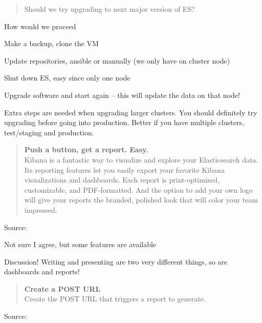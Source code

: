 \documentclass[Screen16to9,17pt]{foils}
\begin{document}



\begin{quote}
Should we try upgrading to next major version of ES?\\
\end{quote}

How would we proceed
\begin{list2}
\item Make a backup, clone the VM
\item Update repositories, ansible or manually (we only have on cluster node)
\item Shut down ES, easy since only one node
\item Upgrade software and start again -- this will update the data on that node!
\end{list2}

Extra steps are needed when upgrading larger clusters. You should definitely try upgrading before going into production. Better if you have multiple clusters, test/staging and production.



\begin{quote}{\bf
Push a button, get a report. Easy.}\\
Kibana is a fantastic way to visualize and explore your Elasticsearch data. Its reporting features let you easily export your favorite Kibana visualizations and dashboards. Each report is print-optimized, customizable, and PDF-formatted. And the option to add your own logo will give your reports the branded, polished look that will color your team impressed.
\end{quote}
Source: 


\begin{list2}
\item Not sure I agree, but some features are available
\item Discussion! Writing and presenting are two very different things, so are dashboards and reports!
\end{list2}



\begin{quote}{\bf
Create a POST URL}\\
Create the POST URL that triggers a report to generate.
\end{quote}
Source: 
\end{document}
